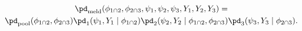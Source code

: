 \begin{multline*}
  \pd_{\text{meld}} (\phi_{1 \cap 2}, \phi_{2 \cap 3}, \psi_{1}, \psi_{2}, \psi_{3}, Y_{1}, Y_{2}, Y_{3}) = \\    
    \pd_{\text{pool}}(\phi_{1 \cap 2}, \phi_{2 \cap 3})
    \pd_{1} (\psi_{1}, Y_{1} \mid \phi_{1 \cap 2})
    \pd_{2} (\psi_{2}, Y_{2} \mid \phi_{1 \cap 2}, \phi_{2 \cap 3})
    \pd_{3} (\psi_{3}, Y_{3} \mid \phi_{2 \cap 3}). 
  \label{eqn:melded-model-cond}
\end{multline*}